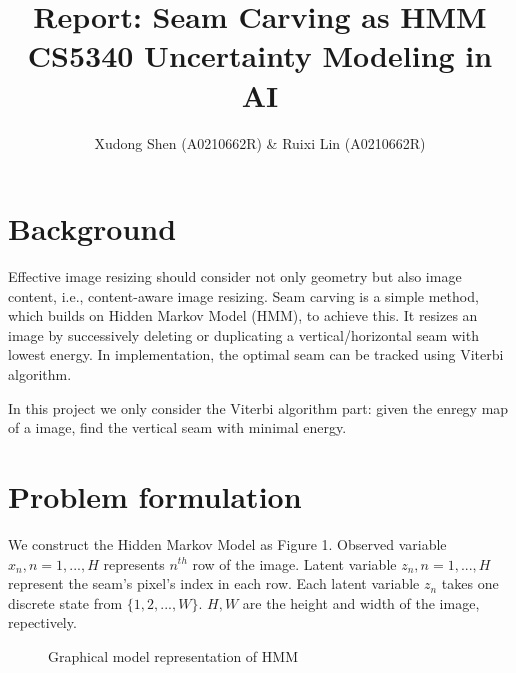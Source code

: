 \documentclass{article}
\begin{document}
\title{Report: Seam Carving as HMM \\ CS5340 Uncertainty Modeling in AI}
\author{Xudong Shen (A0210662R) \& Ruixi Lin (A0210662R)}
\maketitle

\section*{Background}
	Effective image resizing should consider not only geometry but also image content, i.e., content-aware image resizing. Seam carving \cite{SeamCarving} is a simple method, which builds on Hidden Markov Model (HMM), to achieve this. It resizes an image by successively deleting or duplicating a vertical/horizontal seam with lowest energy. In implementation, the optimal seam can be tracked using Viterbi algorithm.

	In this project we only consider the Viterbi algorithm part: given the enregy map of a image, find the vertical seam with minimal energy.

\section*{Problem formulation}
	We construct the Hidden Markov Model as Figure 1. Observed variable $x_{n}, n=1, ..., H$ represents $n^{th}$ row of the image. Latent variable $z_{n}, n=1, ..., H$ represent the seam's pixel's index in each row. Each latent variable $z_{n}$ takes one discrete state from $\{1, 2, ..., W\}$. $H, W$ are the height and width of the image, repectively.

	\begin{figure}[htbp]
	\begin{center}
    \end{center}
    \caption{Graphical model representation of HMM}
    \end{figure}
\end{document}
